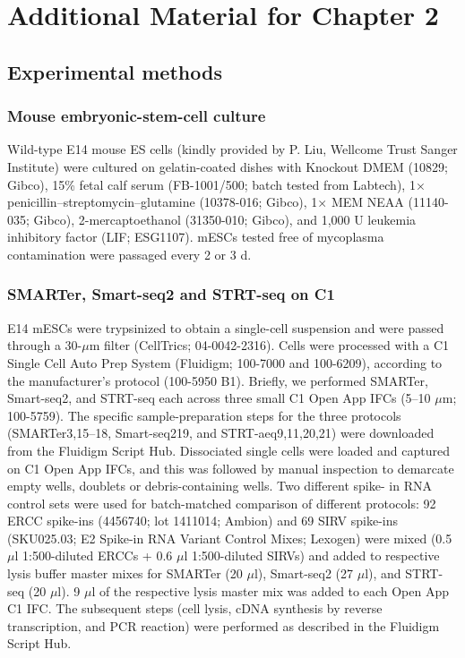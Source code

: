 \chapter{Additional Material for Chapter 2} 

\graphicspath{{Appendix1/Figs/}}

\section{Experimental methods}

\subsection{Mouse embryonic-stem-cell culture}

\begin{sloppypar}
Wild-type E14 mouse ES cells (kindly provided by P. Liu, Wellcome Trust Sanger Institute) were cultured on gelatin-coated dishes with Knockout DMEM (10829; Gibco), 15\% fetal calf serum (FB-1001/500; batch tested from Labtech), 1× penicillin–streptomycin–glutamine (10378-016; Gibco), 1× MEM NEAA (11140-035; Gibco), 2-mercaptoethanol (31350-010; Gibco), and 1,000 U leukemia inhibitory factor (LIF; ESG1107). mESCs tested free of mycoplasma contamination were passaged every 2 or 3 d.
\end{sloppypar}

\subsection{SMARTer, Smart-seq2 and STRT-seq on C1}

\begin{sloppypar}
E14 mESCs were trypsinized to obtain a single-cell suspension and were passed through a 30-\( \mu \)m filter (CellTrics; 04-0042-2316). Cells were processed with a C1 Single Cell Auto Prep System (Fluidigm; 100-7000 and 100-6209), according to the manufacturer’s protocol (100-5950 B1). Briefly, we performed SMARTer, Smart-seq2, and STRT-seq each across three small C1 Open App IFCs (5–10 \( \mu \)m; 100-5759). The specific sample-preparation steps for the three protocols (SMARTer3,15–18, Smart-seq219, and STRT-aeq9,11,20,21) were downloaded from the Fluidigm Script Hub. Dissociated single cells were loaded and captured on C1 Open App IFCs, and this was followed by manual inspection to demarcate empty wells, doublets or debris-containing wells. Two different spike- in RNA control sets were used for batch-matched comparison of different protocols: 92 ERCC spike-ins (4456740; lot 1411014; Ambion) and 69 SIRV spike-ins (SKU025.03; E2 Spike-in RNA Variant Control Mixes; Lexogen) were mixed (0.5 \( \mu \)l 1:500-diluted ERCCs + 0.6 \( \mu \)l 1:500-diluted SIRVs) and added to respective lysis buffer master mixes for SMARTer (20 \( \mu \)l), Smart-seq2 (27 \( \mu \)l), and STRT-seq (20 \( \mu \)l). 9 \( \mu \)l of the respective lysis master mix was added to each Open App C1 IFC. The subsequent steps (cell lysis, cDNA synthesis by reverse transcription, and PCR reaction) were performed as described in the Fluidigm Script Hub.
\end{sloppypar}


